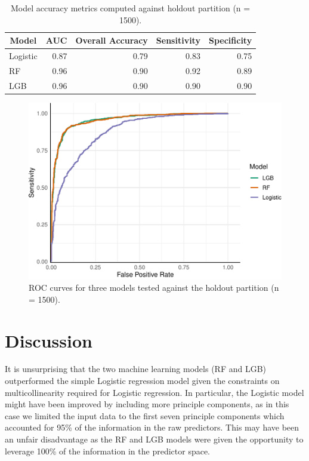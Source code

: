 \documentclass[review]{elsarticle} %
\begin{document}
\begin{table}

\caption{\label{tab:metrics}Model accuracy metrics computed against holdout partition (n = 1500).}
\centering
\fontsize{12}{14}\selectfont
\begin{tabular}[t]{lrrrr}
\toprule
\multicolumn{1}{c}{Model} & \multicolumn{1}{c}{AUC} & \multicolumn{1}{c}{Overall Accuracy} & \multicolumn{1}{c}{Sensitivity} & \multicolumn{1}{c}{Specificity}\\
\midrule
Logistic & 0.87 & 0.79 & 0.83 & 0.75\\
\addlinespace
RF & 0.96 & 0.90 & 0.92 & 0.89\\
\addlinespace
LGB & 0.96 & 0.90 & 0.90 & 0.90\\
\bottomrule
\end{tabular}
\end{table}

\begin{figure}
\includegraphics[width=1\linewidth]{report_files/figure-latex/roc-1} \caption{ROC curves for three models tested against the holdout partition (n = 1500).}\label{fig:roc}
\end{figure}

\hypertarget{discussion}{%
\section{Discussion}\label{discussion}}

It is unsurprising that the two machine learning models (RF and LGB)
outperformed the simple Logistic regression model given the constraints
on multicollinearity required for Logistic regression.
In particular, the Logistic model might have been improved by including more
principle components, as in this case we limited the input data to the first
seven principle components which accounted for 95\% of the information in the
raw predictors.
This may have been an unfair disadvantage as the RF and LGB models were given
the opportunity to leverage 100\% of the information in the predictor space.
\end{document}
